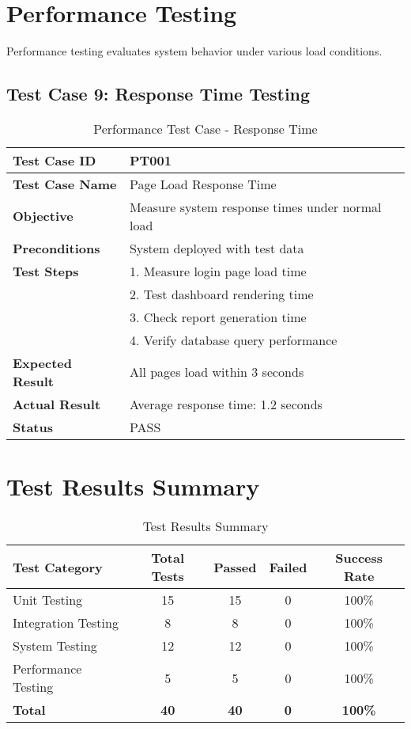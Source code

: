 \section{Performance Testing}

Performance testing evaluates system behavior under various load conditions.

\subsection{Test Case 9: Response Time Testing}
\begin{table}[h]
\centering
\begin{tabular}{|p{3cm}|p{10cm}|}
\hline
\textbf{Test Case ID} & PT001 \\
\hline
\textbf{Test Case Name} & Page Load Response Time \\
\hline
\textbf{Objective} & Measure system response times under normal load \\
\hline
\textbf{Preconditions} & System deployed with test data \\
\hline
\textbf{Test Steps} & 1. Measure login page load time\\
& 2. Test dashboard rendering time\\
& 3. Check report generation time\\
& 4. Verify database query performance \\
\hline
\textbf{Expected Result} & All pages load within 3 seconds \\
\hline
\textbf{Actual Result} & Average response time: 1.2 seconds \\
\hline
\textbf{Status} & PASS \\
\hline
\end{tabular}
\caption{Performance Test Case - Response Time}
\end{table}

\section{Test Results Summary}

\begin{table}[h]
\centering
\begin{tabular}{|l|c|c|c|c|}
\hline
\textbf{Test Category} & \textbf{Total Tests} & \textbf{Passed} & \textbf{Failed} & \textbf{Success Rate} \\
\hline
Unit Testing & 15 & 15 & 0 & 100\% \\
\hline
Integration Testing & 8 & 8 & 0 & 100\% \\
\hline
System Testing & 12 & 12 & 0 & 100\% \\
\hline
Performance Testing & 5 & 5 & 0 & 100\% \\
\hline
\textbf{Total} & \textbf{40} & \textbf{40} & \textbf{0} & \textbf{100\%} \\
\hline
\end{tabular}
\caption{Test Results Summary}
\end{table}

